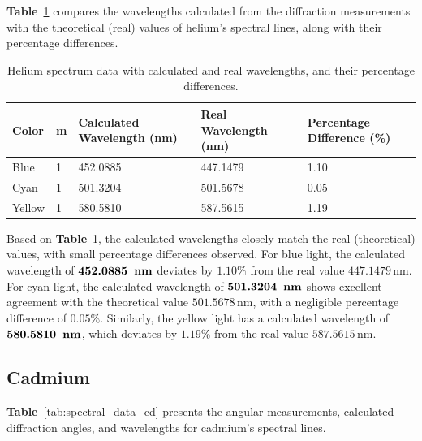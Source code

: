 \documentclass[a4paper,11pt]{article}
\begin{document}
\textbf{Table}~\ref{tab:Helium_spectrum} compares the wavelengths calculated from the diffraction measurements with the theoretical (real) values of helium's spectral lines, along with their percentage differences.

\begin{table}[ht]
  \centering
  \begin{tabular}{lllll}
  \toprule
  \textbf{Color} & \textbf{m} & \textbf{Calculated Wavelength (nm)} & \textbf{Real Wavelength (nm)} & \textbf{Percentage Difference (\%)} \\
  \midrule
  Blue   & 1 & 452.0885 & 447.1479 & 1.10 \\
  Cyan   & 1 & 501.3204 & 501.5678 & 0.05 \\
  Yellow & 1 & 580.5810 & 587.5615 & 1.19 \\
  \bottomrule
  \end{tabular}
  \caption{Helium spectrum data with calculated and real wavelengths, and their percentage differences.\cite{sciencephoto_helium_spectra}\cite{nist_helium_spectrum}}
  \label{tab:Helium_spectrum}
  \end{table}
  \quad Based on \textbf{Table}~\ref{tab:Helium_spectrum}, the calculated wavelengths closely match the real (theoretical) values, with small percentage differences observed. For blue light, the calculated wavelength of \(\textbf{452.0885\, \text{nm}}\) deviates by \(1.10\%\) from the real value \(447.1479 \, \text{nm}\). For cyan light, the calculated wavelength of \(\textbf{501.3204\, \text{nm}}\) shows excellent agreement with the theoretical value \(501.5678 \, \text{nm}\), with a negligible percentage difference of \(0.05\%\). Similarly, the yellow light has a calculated wavelength of \(\textbf{580.5810\, \text{nm}}\), which deviates by \(1.19\%\) from the real value \(587.5615 \, \text{nm}\).

\newpage
\subsection*{Cadmium}
\label{sec:cadmium}

\textbf{Table}~\ref{tab:spectral_data_cd} presents the angular measurements, calculated diffraction angles, and wavelengths for cadmium’s spectral lines.
\end{document}
